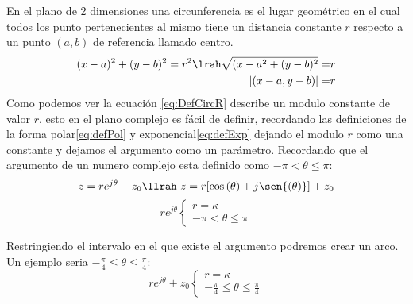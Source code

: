 En el plano de 2 dimensiones una circunferencia es el lugar geométrico en el cual todos los punto pertenecientes al mismo tiene un distancia constante $r$ respecto a un punto $(a,b)$ de referencia llamado centro.
\begin{equation}\label{eq:DefCircR}
    \begin{aligned}
       (x-a)^2+(y-b)^2=r^2 \lrah \sqrt{(x-a^2+(y-b)^2}=&r \\
       |(x-a,y-b)|=&r
    \end{aligned}
\end{equation} 
Como podemos ver la ecuación \ref{eq:DefCircR} describe un modulo constante de valor $r$, esto en el plano complejo es fácil de definir, recordando las definiciones de la forma polar\ref{eq:defPol} y exponencial\ref{eq:defExp} dejando el modulo $r$ como una constante y dejamos el argumento como un  parámetro. Recordando que el argumento de un numero complejo esta definido como $-\pi<\theta\leq\pi$:
\begin{equation}\label{eq:ParamcircF}
    z=re^{j\theta}+z_0 \llrah\ z=r[\cos{(\theta)}+j\sen{(\theta)}]+z_0
\end{equation}
\begin{equation}
    re^{j\theta}
    \begin{cases}
        r=\kappa\\
        -\pi<\theta\leq\pi
    \end{cases}
\end{equation}
\begin{figure}[H]
    \centering
    
    \label{fig:CircCF}
\end{figure}
Restringiendo el intervalo en el que existe el argumento podremos crear un arco. Un ejemplo seria $-\frac{\pi}{4}\leq\theta\leq\frac{\pi}{4}$:
\begin{equation}
    re^{j\theta}+z_0
    \begin{cases}
        r=\kappa\\
        -\frac{\pi}{4}\leq\theta\leq\frac{\pi}{4}
    \end{cases}
\end{equation}
\begin{figure}[H]
    \centering
    
    \label{fig:ArcCF}
\end{figure}

